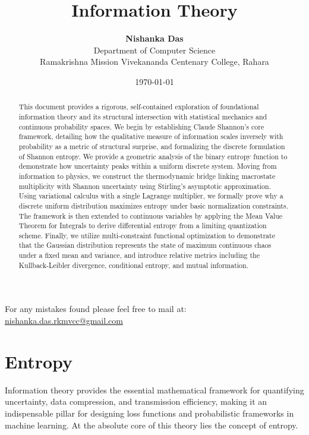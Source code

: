 \documentclass[11pt,a4paper]{article}
\title{\textbf{Information Theory}}
\author{\textbf{Nishanka Das} \\ 
Department of Computer Science \\ 
Ramakrishna Mission Vivekananda Centenary College, Rahara}
\date{\today}
\begin{document}
\maketitle

\begin{center}
For any mistakes found please feel free to mail at: \\
\url{nishanka.das.rkmvcc@gmail.com}
\end{center}

\begin{abstract}
This document provides a rigorous, self-contained exploration of foundational information theory and its structural intersection with statistical mechanics and continuous probability spaces. We begin by establishing Claude Shannon's core framework, detailing how the qualitative measure of information scales inversely with probability as a metric of structural surprise, and formalizing the discrete formulation of Shannon entropy. We provide a geometric analysis of the binary entropy function to demonstrate how uncertainty peaks within a uniform discrete system. Moving from information to physics, we construct the thermodynamic bridge linking macrostate multiplicity with Shannon uncertainty using Stirling's asymptotic approximation. Using variational calculus with a single Lagrange multiplier, we formally prove why a discrete uniform distribution maximizes entropy under basic normalization constraints. The framework is then extended to continuous variables by applying the Mean Value Theorem for Integrals to derive differential entropy from a limiting quantization scheme. Finally, we utilize multi-constraint functional optimization to demonstrate that the Gaussian distribution represents the state of maximum continuous chaos under a fixed mean and variance, and introduce relative metrics including the Kullback-Leibler divergence, conditional entropy, and mutual information.
\end{abstract}
\section{Entropy}
Information theory provides the essential mathematical framework for quantifying uncertainty, data compression, and transmission efficiency, making it an indispensable pillar for designing loss functions and probabilistic frameworks in machine learning. At the absolute core of this theory lies the concept of entropy.
\end{document}
